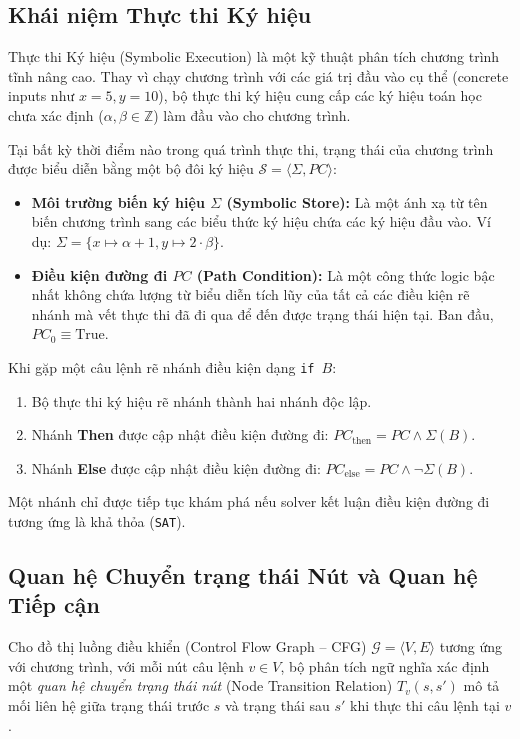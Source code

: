 \subsection{Khái niệm Thực thi Ký hiệu}
Thực thi Ký hiệu (Symbolic Execution) \cite{baldoni2018symbolic} là một kỹ thuật phân tích chương trình tĩnh nâng cao. Thay vì chạy chương trình với các giá trị đầu vào cụ thể (concrete inputs như $x = 5, y = 10$), bộ thực thi ký hiệu cung cấp các ký hiệu toán học chưa xác định ($\alpha, \beta \in \mathbb{Z}$) làm đầu vào cho chương trình.

Tại bất kỳ thời điểm nào trong quá trình thực thi, trạng thái của chương trình được biểu diễn bằng một bộ đôi ký hiệu $\mathcal{S} = \langle \Sigma, PC \rangle$:
\begin{itemize}
    \item \textbf{Môi trường biến ký hiệu $\Sigma$ (Symbolic Store):} Là một ánh xạ từ tên biến chương trình sang các biểu thức ký hiệu chứa các ký hiệu đầu vào. Ví dụ: $\Sigma = \{x \mapsto \alpha + 1, y \mapsto 2 \cdot \beta\}$.
    \item \textbf{Điều kiện đường đi $PC$ (Path Condition):} Là một công thức logic bậc nhất không chứa lượng từ biểu diễn tích lũy của tất cả các điều kiện rẽ nhánh mà vết thực thi đã đi qua để đến được trạng thái hiện tại. Ban đầu, $PC_0 \equiv \text{True}$.
\end{itemize}

Khi gặp một câu lệnh rẽ nhánh điều kiện dạng \texttt{if $B$}:
\begin{enumerate}
    \item Bộ thực thi ký hiệu rẽ nhánh thành hai nhánh độc lập.
    \item Nhánh \textbf{Then} được cập nhật điều kiện đường đi: $PC_{\text{then}} = PC \land \Sigma(B)$.
    \item Nhánh \textbf{Else} được cập nhật điều kiện đường đi: $PC_{\text{else}} = PC \land \neg \Sigma(B)$.
\end{enumerate}

Một nhánh chỉ được tiếp tục khám phá nếu solver kết luận điều kiện đường đi tương ứng là khả thỏa (\texttt{SAT}).

\subsection{Quan hệ Chuyển trạng thái Nút và Quan hệ Tiếp cận}
Cho đồ thị luồng điều khiển (Control Flow Graph -- CFG) $\mathcal{G} = \langle V, E \rangle$ tương ứng với chương trình, với mỗi nút câu lệnh $v \in V$, bộ phân tích ngữ nghĩa xác định một \textit{quan hệ chuyển trạng thái nút} (Node Transition Relation) $T_v(s, s')$ mô tả mối liên hệ giữa trạng thái trước $s$ và trạng thái sau $s'$ khi thực thi câu lệnh tại $v$.

